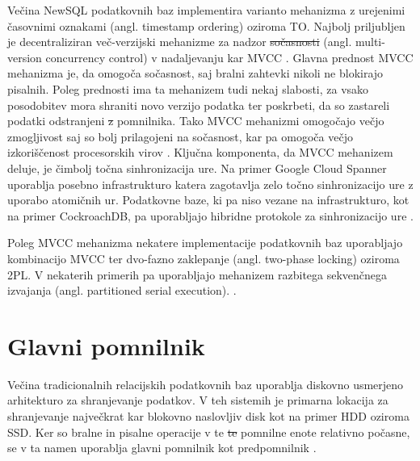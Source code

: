 \documentclass[a4paper, 12pt]{book}
\providecommand{\DIFaddtex}[1]{{\protect\color{blue}\uwave{#1}}} %
\providecommand{\DIFdeltex}[1]{{\protect\color{red}\sout{#1}}}                      %
\providecommand{\DIFaddbegin}{} %
\providecommand{\DIFaddend}{} %
\providecommand{\DIFdelbegin}{} %
\providecommand{\DIFdelend}{} %
\providecommand{\DIFadd}[1]{\texorpdfstring{\DIFaddtex{#1}}{#1}} %
\providecommand{\DIFdel}[1]{\texorpdfstring{\DIFdeltex{#1}}{}} %
\newcommand{\DIFscaledelfig}{0.5}
\newlength{\DIFdelgraphicswidth} %
\newlength{\DIFdelgraphicsheight} %
\newcommand{\DIFaddincludegraphics}[2][]{{\color{blue}\fbox{\DIFOincludegraphics[#1]{#2}}}} %
\newcommand{\DIFdelincludegraphics}[2][]{%
\sbox{\DIFdelgraphicsbox}{\DIFOincludegraphics[#1]{#2}}%
\settoboxwidth{\DIFdelgraphicswidth}{\DIFdelgraphicsbox} %
\settoboxtotalheight{\DIFdelgraphicsheight}{\DIFdelgraphicsbox} %
\scalebox{\DIFscaledelfig}{%
\parbox[b]{\DIFdelgraphicswidth}{\usebox{\DIFdelgraphicsbox}\\[-\baselineskip] \rule{\DIFdelgraphicswidth}{0em}}\llap{\resizebox{\DIFdelgraphicswidth}{\DIFdelgraphicsheight}{%
\setlength{\unitlength}{\DIFdelgraphicswidth}%
\begin{picture}(1,1)%
\thicklines\linethickness{2pt} %
{\color[rgb]{1,0,0}\put(0,0){\framebox(1,1){}}}%
{\color[rgb]{1,0,0}\put(0,0){\line( 1,1){1}}}%
{\color[rgb]{1,0,0}\put(0,1){\line(1,-1){1}}}%
\end{picture}%
}\hspace*{3pt}}} %
} %
\DeclareRobustCommand{\DIFaddbegin}{\DIFOaddbegin \let\includegraphics\DIFaddincludegraphics} %
\DeclareRobustCommand{\DIFaddend}{\DIFOaddend \let\includegraphics\DIFOincludegraphics} %
\DeclareRobustCommand{\DIFdelbegin}{\DIFOdelbegin \let\includegraphics\DIFdelincludegraphics} %
\DeclareRobustCommand{\DIFdelend}{\DIFOaddend \let\includegraphics\DIFOincludegraphics} %
\begin{document}
Večina NewSQL podatkovnih baz implementira varianto mehanizma z urejenimi časovnimi oznakami (angl. timestamp ordering) oziroma TO. Najbolj priljubljen je decentraliziran več-verzijski mehanizme za nadzor \DIFdelbegin \DIFdel{sočasnosti }\DIFdelend \DIFaddbegin \DIFadd{so\-čas\-no\-sti }\DIFaddend (angl. multi-version concurrency control) v nadaljevanju kar MVCC \cite{Pavlo2016Sep}.
Glavna prednost MVCC mehanizma je, da omogoča sočasnost, saj bralni zahtevki nikoli ne blokirajo pisalnih. Poleg prednosti ima ta mehanizem tudi nekaj slabosti, za vsako posodobitev mora shraniti novo verzijo podatka ter poskrbeti, da so zastareli podatki odstranjeni \DIFdelbegin \DIFdel{z }\DIFdelend \DIFaddbegin \DIFadd{iz }\DIFaddend pomnilnika. Tako MVCC mehanizmi omogočajo večjo zmogljivost saj so bolj prilagojeni na sočasnost, kar pa omogoča večjo izkoriščenost procesorskih virov \cite{MainMemoryDatabaseSystems}. Ključna komponenta, da MVCC mehanizem deluje, je čimbolj točna sinhronizacija ure. Na primer Google Cloud Spanner uporablja posebno infrastrukturo katera zagotavlja zelo točno sinhronizacijo ure z uporabo atomičnih ur. Podatkovne baze, ki pa niso vezane na infrastrukturo, kot na primer CockroachDB, pa uporabljajo hibridne protokole za sinhronizacijo ure \cite{Pavlo2016Sep}.

Poleg MVCC mehanizma nekatere implementacije podatkovnih baz uporabljajo kombinacijo MVCC ter dvo-fazno zaklepanje (angl. two-phase locking) oziroma 2PL. V nekaterih primerih pa uporabljajo mehanizem razbitega sekvenčnega izvajanja (angl. partitioned serial
execution). \cite{Pavlo2016Sep, MainMemoryDatabaseSystems}.

\section{Glavni pomnilnik}

Večina tradicionalnih relacijskih podatkovnih baz uporablja diskovno usmerjeno arhitekturo za shranjevanje podatkov. V teh sistemih je primarna lokacija za shranjevanje največkrat kar blokovno naslovljiv disk kot na primer HDD oziroma SSD. Ker so bralne in pisalne operacije v te \DIFdelbegin \DIFdel{te }\DIFdelend pomnilne enote relativno počasne, se v ta namen uporablja glavni pomnilnik kot predpomnilnik \cite{Pavlo2016Sep}.
\end{document}
